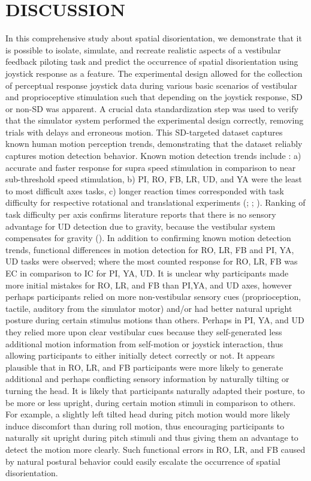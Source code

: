 \documentclass[11pt, onecolumn]{article}
\begin{document}
\section{DISCUSSION}
In this comprehensive study about spatial disorientation, we demonstrate that it is possible to isolate, simulate, and recreate realistic aspects of a vestibular feedback piloting task and predict the occurrence of spatial disorientation using joystick response as a feature.  The experimental design allowed for the collection of perceptual response joystick data during various basic scenarios of vestibular and proprioceptive stimulation such that depending on the joystick response, SD or non-SD was apparent.  A crucial data standardization step was used to verify that the simulator system performed the experimental design correctly, removing trials with delays and erroneous motion.  This SD-targeted dataset captures known human motion perception trends, demonstrating that the dataset reliably captures motion detection behavior.  Known motion detection trends include : a) accurate and faster response for supra speed stimulation in comparison to near sub-threshold speed stimulation, b) PI, RO, FB, LR, UD, and YA were the least to most difficult axes tasks, c) longer reaction times corresponded with task difficulty for respective rotational and translational experiments (\cite{Valko_2012_Vestibular}; \cite{Hartmann_2014_Direction}; \cite{Karmali_2017_Multivariate}).  Ranking of task difficulty per axis confirms literature reports that there is no sensory advantage for UD detection due to gravity, because the vestibular system compensates for gravity (\cite{Valko_2012_Vestibular}).  In addition to confirming known motion detection trends, functional differences in motion detection for RO, LR, FB and PI, YA, UD tasks were observed; where the most counted response for RO, LR, FB was EC in comparison to IC for PI, YA, UD.  It is unclear why participants made more initial mistakes for  RO, LR, and FB than PI,YA, and UD axes, however perhaps participants relied on more non-vestibular sensory cues (proprioception, tactile, auditory from the simulator motor) and/or had better natural upright posture during certain stimulus motions than others.  Perhaps in PI, YA, and UD they relied more upon clear vestibular cues because they self-generated less additional motion information from self-motion or joystick interaction, thus allowing participants to either initially detect correctly or not.  It appears plausible that in RO, LR, and FB participants were more likely to generate additional and perhaps conflicting sensory information by naturally tilting or turning the head.  It is likely that participants naturally adapted their posture, to be more or less upright, during certain motion stimuli in comparison to others.  For example, a slightly left tilted head during pitch motion would more likely induce discomfort than during roll motion, thus encouraging participants to naturally sit upright during pitch stimuli and thus giving them an advantage to detect the motion more clearly.  Such functional errors in RO, LR, and FB caused by natural postural behavior could easily escalate the occurrence of spatial disorientation.
\end{document}
